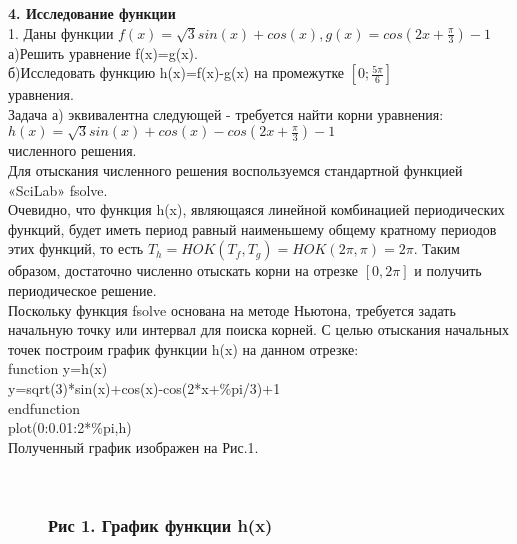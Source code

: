 \documentclass[russian,utf8,nocolumnxxxi,nocolumnxxxii]{eskdtext}
\begin{document}
\newpage


\newpage
{\bf4. Исследование функции}
\\1. Даны функции $f(x)=\sqrt{3}sin(x)+cos(x),g(x)=cos(2x+\frac{\pi}{3})-1$
\\а)Решить уравнение f(x)=g(x).
\\б)Исследовать функцию h(x)=f(x)-g(x) на промежутке $[0;\frac{5\pi}{6}]$\\
{ уравнения.}\\
Задача а) эквивалентна следующей - требуется найти корни уравнения:\\
$h(x)=\sqrt{3}sin(x)+cos(x)-cos(2x+\frac{\pi}{3})-1$\\

{ численного решения.}\\
Для отыскания численного решения воспользуемся стандартной функцией «SciLab» fsolve.\\
Очевидно, что функция h(x), являющаяся линейной комбинацией периодических функций, будет иметь период равный наименьшему общему кратному периодов этих функций, то есть $T_h=HOK(T_f,T_g)=HOK(2\pi,\pi)=2\pi.$ Таким образом, достаточно численно отыскать корни на отрезке $[0,2\pi]$ и получить периодическое решение. \\
Поскольку функция fsolve основана на методе Ньютона, требуется задать начальную точку или интервал для поиска корней. С целью отыскания начальных точек построим график функции h(x) на данном отрезке:\\
function y=h(x)\\
y=sqrt(3)*sin(x)+cos(x)-cos(2*x+\%pi/3)+1\\
endfunction\\
plot(0:0.01:2*\%pi,h)\\
Полученный график изображен на Рис.1.
\newpage

\begin{figure}[H]
\begin{center}
\begin{minipage}[h]{0.65\linewidth}
  \\
\frametitle{ Рис 1. График функции h(x)}
\end{minipage}
\end{center}
\end{figure}
\end{document}
